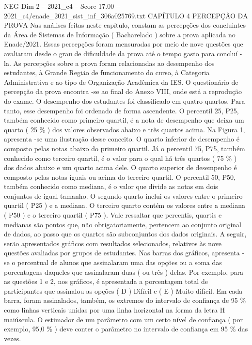 \begin{textsample}{NEG Dim 2 – 2021\_c4 – Score 17.00 – 2021\_c4/enade\_2021\_sist\_inf\_306a025769.txt}  \label{ex:f2_neg_399}
CAPÍTULO 4 PERCEPÇÃO DA PROVA Nas análises feitas neste capítulo, constam as percepções dos concluintes da Área de Sistemas de Informação ( Bacharelado ) sobre a prova aplicada no Enade/2021.
Essas percepções foram mensuradas por meio de nove questões que avaliaram desde o grau de dificuldade da prova até o tempo gasto para concluí -la.
As percepções sobre a prova foram relacionadas ao desempenho dos estudantes, à Grande Região de funcionamento do curso, à Categoria Administrativa e ao tipo de Organização Acadêmica da IES.
O questionário de percepção da prova encontra -se ao final do Anexo VIII, onde está a reprodução do exame.
O desempenho dos estudantes foi classificado em quatro quartos.
Para tanto, esse desempenho foi ordenado de forma ascendente.
O percentil 25, P25, também conhecido como primeiro quartil, é a nota de desempenho que deixa um quarto ( 25 \% ) dos valores observados abaixo e três quartos acima.
Na Figura 1, apresenta -se uma ilustração desse conceito.
O quarto inferior de desempenho é composto pelas notas abaixo do primeiro quartil.
Já o percentil 75, P75, também conhecido como terceiro quartil, é o valor para o qual há três quartos ( 75 \% ) dos dados abaixo e um quarto acima dele.
O quarto superior de desempenho é composto pelas notas iguais ou acima do terceiro quartil.
O percentil 50, P50, também conhecido como mediana, é o valor que divide as notas em dois conjuntos de igual tamanho.
O segundo quarto inclui os valores entre o primeiro quartil ( P25 ) e a mediana.
O terceiro quarto contém os valores entre a mediana ( P50 ) e o terceiro quartil ( P75 ).
Vale ressaltar que percentis, quartis e medianas são pontos que, não obrigatoriamente, pertencem ao conjunto original de dados, ao passo que os quartos são subconjuntos dos dados originais.
A seguir, serão apresentados gráficos com resultados selecionados, relativos às nove questões avaliadas por grupos de estudantes.
Nas barras dos gráficos, apresenta -se o percentual de alunos que assinalaram uma das opções ou a soma das porcentagens daqueles que assinalaram duas ( ou três ) delas.
Por exemplo, para as questões 1 e 2, nos gráficos, é apresentada a porcentagem total de participantes que assinalou as opções ( D ) Difícil e ( E ) Muito difícil.
Em cada barra, foram assinalados, também, os extremos do intervalo de confiança de 95 \% como linhas verticais unidas por uma linha horizontal na forma da letra H maiúscula.
O estimador de um parâmetro com um certo nível de confiança ( por exemplo, 95,0 \% ) deve conter o parâmetro no intervalo de confiança em 95 \% das vezes.

\end{textsample}
